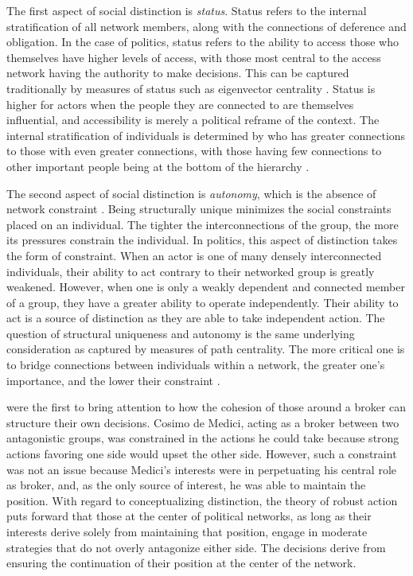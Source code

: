 \documentclass[12pt]{article}
\begin{document}
The first aspect of social distinction is \textit{status}. Status refers to the internal stratification of all network members, along with the connections of deference and obligation. In the case of politics, status refers to the ability to access those who themselves have higher levels of access, with those most central to the access network having the authority to make decisions. This can be captured traditionally by measures of status such as eigenvector centrality \citep{bonacich1972factoring-03e}. Status is higher for actors when the people they are connected to are themselves influential, and accessibility is merely a political reframe of the context. The internal stratification of individuals is determined by who has greater connections to those with even greater connections, with those having few connections to other important people being at the bottom of the hierarchy \citep{bonacich1972factoring-03e}. 

The second aspect of social distinction is \textit{autonomy}, which is the absence of network constraint \citep{burt1980autonomy}. Being structurally unique minimizes the social constraints placed on an individual. The tighter the interconnections of the group, the more its pressures constrain the individual. In politics, this aspect of distinction takes the form of constraint. When an actor is one of many densely interconnected individuals, their ability to act contrary to their networked group is greatly weakened. However, when one is only a weakly dependent and connected member of a group, they have a greater ability to operate independently. Their ability to act is a source of distinction as they are able to take independent action. The question of structural uniqueness and autonomy is the same underlying consideration as captured by measures of path centrality. The more critical one is to bridge connections between individuals within a network, the greater one's importance, and the lower their constraint \citep{burt1995structural-5e8}. 

\citet[1263-4]{padgett1993robust} were the first to bring attention to how the cohesion of those around a broker can structure their own decisions. Cosimo de Medici, acting as a broker between two antagonistic groups, was constrained in the actions he could take because strong actions favoring one side would upset the other side. However, such a constraint was not an issue because Medici’s interests were in perpetuating his central role as broker, and, as the only source of interest, he was able to maintain the position. With regard to conceptualizing distinction, the theory of robust action puts forward that those at the center of political networks, as long as their interests derive solely from maintaining that position, engage in moderate strategies that do not overly antagonize either side. The decisions derive from ensuring the continuation of their position at the center of the network. 
\end{document}
